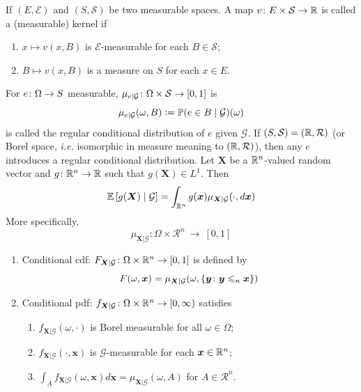 \documentclass[a4paper,12pt]{article}
\begin{document}
\begin{itemize}
  \noindent If $(E,\mathcal{E})$ and $(S,\mathcal{S})$ be two measurable spaces. A map $v \colon E \times \mathcal{S} \rightarrow \mathbb{R}$ is called a (measurable) kernel if
  \begin{enumerate}[label=(\arabic*)]
    \item $x \mapsto v(x,B)$ is $\mathcal{E}$-measurable for each $B \in \mathcal{S}$;
    \item $B \mapsto v(x,B)$ is a measure on $S$ for each $x \in E$.
  \end{enumerate}

  \noindent For $e \colon \Omega \rightarrow S$ measurable, $\mu_{e|\mathcal{G}} \colon \Omega \times \mathcal{S} \rightarrow [0,1]$ is
  \begin{equation*}
    \mu_{e|\mathcal{G}}(\omega, B) \vcentcolon= \mathbb{P}(e \in B \mid \mathcal{G})(\omega)
  \end{equation*}
  is called the regular conditional distribution of $e$ given $\mathcal{G}$. If $(S,\mathcal{S}) = (\mathbb{R},\mathcal{R})$ (or Borel space, \emph{i.e.} isomorphic in measure meaning to $(\mathbb{R},\mathcal{R})$), then any $e$ introduces a regular conditional distribution. Let $\boldsymbol{X}$ be a $\mathbb{R}^n$-valued random vector and $g \colon \mathbb{R}^n \rightarrow \mathbb{R}$ such that $g(\boldsymbol{X}) \in L^1$. Then
  \begin{equation*}
    \mathbb{E}\left[g(\boldsymbol{X}) \mid \mathcal{G}\right] = \int_{\mathbb{R}^n} g(\boldsymbol{x})\mu_{\boldsymbol{X} | \mathcal{G}}(\cdot, d\boldsymbol{x})
  \end{equation*}
  More specifically,
  \begin{equation*}
    \mu_{\boldsymbol{X} | \mathcal{G}} \colon \Omega \times \mathcal{R}^n ~\longrightarrow~ [0,1]
  \end{equation*}
  \begin{enumerate}[label=(\arabic*)]
    \item Conditional cdf: $F_{\boldsymbol{X} | \mathcal{G}} \colon \Omega \times \mathbb{R}^n \rightarrow [0,1]$ is defined by
    \begin{equation*}
      F(\omega, \boldsymbol{x}) = \mu_{\boldsymbol{X} | \mathcal{G}}(\omega, \left\{\boldsymbol{y} \colon\boldsymbol{y} \leqslant_n \boldsymbol{x}\right\})
    \end{equation*}

    \item Conditional pdf: $f_{\boldsymbol{X} | \mathcal{G}} \colon \Omega \times \mathbb{R}^n \rightarrow [0,\infty)$ satisfies
    \begin{enumerate}[label=(\roman*)]
      \item $f_{\boldsymbol{X} | \mathcal{G}}(\omega,\cdot)$ is Borel measurable for all $\omega \in \Omega$;
      \item $f_{\boldsymbol{X} | \mathcal{G}}(\cdot, \boldsymbol{x})$ is $\mathcal{G}$-measurable for each $\boldsymbol{x} \in \mathbb{R}^n$;
      \item $\int_A f_{\boldsymbol{X} | \mathcal{G}}(\omega, \boldsymbol{x})d\boldsymbol{x} = \mu_{\boldsymbol{X} | \mathcal{G}} (\omega, A)$ for $A \in \mathcal{R}^n$.
    \end{enumerate}


\end{enumerate}
\end{itemize}
\end{document}
